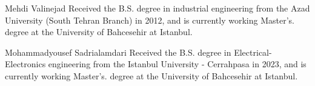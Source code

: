 \documentclass[journal]{IEEEtran}
\begin{document}



% 


\begin{IEEEbiographynophoto}{Mehdi Valinejad}
Received the B.S. degree in industrial engineering from the Azad University (South Tehran Branch) in 2012, and is currently working Master's. degree at the University of Bahcesehir at Istanbul.
\end{IEEEbiographynophoto}

\begin{IEEEbiographynophoto}{Mohammadyousef Sadrialamdari}
Received the B.S. degree in Electrical-Electronics engineering from the  Istanbul University - Cerrahpasa in 2023, and is currently working Master’s. degree at the University of Bahcesehir at Istanbul.
\end{IEEEbiographynophoto}








\end{document}

